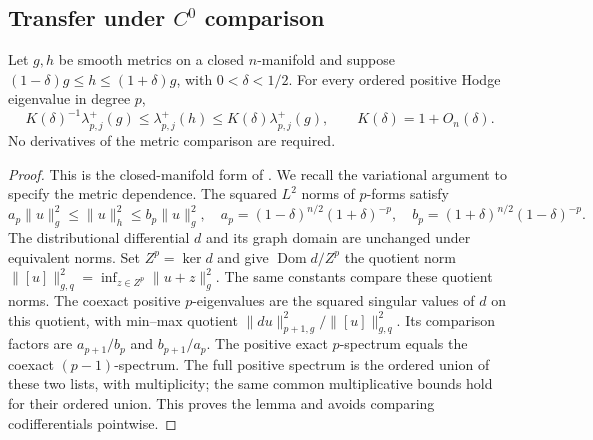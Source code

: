 \subsection{Transfer under \texorpdfstring{$C^0$}{C0} comparison}
\begin{lemma}\label{lem:metric-spectra}
Let $g,h$ be smooth metrics on a closed $n$-manifold and suppose
$(1-\delta)g\le h\le(1+\delta)g$, with $0<\delta<1/2$.
For every ordered positive Hodge eigenvalue in degree $p$,
\[
 K(\delta)^{-1}\lambda_{p,j}^+(g)
 \le\lambda_{p,j}^+(h)\le K(\delta)\lambda_{p,j}^+(g),
 \qquad K(\delta)=1+O_n(\delta).
\]
No derivatives of the metric comparison are required.
\end{lemma}
\begin{proof}
This is the closed-manifold form of \cite[Proposition~3.3]{dodziuk}.
We recall the variational argument to specify the metric dependence.
The squared $L^2$ norms of $p$-forms satisfy
\[
 a_p\|u\|_g^2\le\|u\|_h^2\le b_p\|u\|_g^2,
 \quad a_p=(1-\delta)^{n/2}(1+\delta)^{-p},\quad
 b_p=(1+\delta)^{n/2}(1-\delta)^{-p}.
\]
The distributional differential $d$ and its graph domain are unchanged
under equivalent norms. Set $Z^p=\ker d$ and give
$\operatorname{Dom}d/Z^p$ the quotient norm
$\|[u]\|_{g,q}^2=\inf_{z\in Z^p}\|u+z\|_g^2$.
The same constants compare these quotient norms. The coexact positive
$p$-eigenvalues are the squared singular values of $d$ on this quotient,
with min--max quotient $\|du\|_{p+1,g}^2/\|[u]\|_{g,q}^2$.
Its comparison factors are $a_{p+1}/b_p$ and $b_{p+1}/a_p$.
The positive exact $p$-spectrum equals the coexact $(p-1)$-spectrum.
The full positive spectrum is the ordered union of these two lists,
with multiplicity; the same common multiplicative bounds hold for their
ordered union. This proves the lemma and avoids comparing codifferentials
pointwise.
\end{proof}

